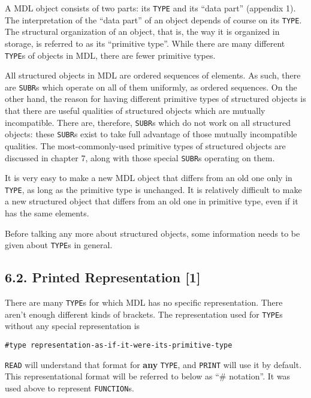 \documentclass[a4paper,]{article}
\begin{document}
A MDL object consists of two parts: its \texttt{TYPE} and its ``data part'' (appendix 1). The interpretation of the ``data
part'' of an object depends of course on its \texttt{TYPE}. The structural organization of an object, that is, the way it
is organized in storage, is referred to as its ``primitive type''. While there are many different \texttt{TYPE}s of objects
in MDL, there are fewer primitive types.

All structured objects in MDL are ordered sequences of elements. As such, there are \texttt{SUBR}s which operate on all of
them uniformly, as ordered sequences. On the other hand, the reason for having different primitive types of structured
objects is that there are useful qualities of structured objects which are mutually incompatible. There are, therefore,
\texttt{SUBR}s which do not work on all structured objects: these \texttt{SUBR}s exist to take full advantage of those
mutually incompatible qualities. The most-commonly-used primitive types of structured objects are discussed in chapter 7,
along with those special \texttt{SUBR}s operating on them.

It is very easy to make a new MDL object that differs from an old one only in \texttt{TYPE}, as long as the primitive type
is unchanged. It is relatively difficult to make a new structured object that differs from an old one in primitive type,
even if it has the same elements.

Before talking any more about structured objects, some information needs to be given about \texttt{TYPE}s in general.

\subsection{6.2. Printed Representation {[}1{]}}\label{printed-representation-1}

There are many \texttt{TYPE}s for which MDL has no specific representation. There aren't enough different kinds of
brackets. The representation used for \texttt{TYPE}s without any special representation is

\begin{verbatim}
#type representation-as-if-it-were-its-primitive-type
\end{verbatim}

 \texttt{READ} will understand that format for \textbf{any} \texttt{TYPE}, and \texttt{PRINT}
will use it by default. This representational format will be referred to below as ``\# notation''. It was used above to
represent \texttt{FUNCTION}s.
\end{document}
